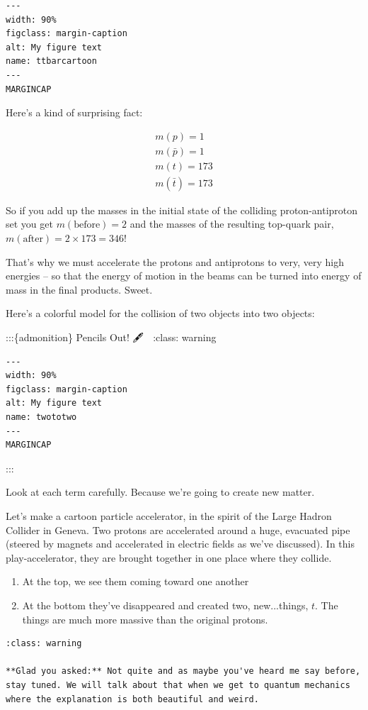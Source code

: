 \documentclass[
]{article}
\begin{document}
\begin{verbatim}
---
width: 90%
figclass: margin-caption
alt: My figure text
name: ttbarcartoon
---
MARGINCAP
\end{verbatim}

Here's a kind of surprising fact:

\begin{align*}
m(p) = 1 \\
m(\bar p) = 1 \\
m(t) = 173 \\
m(\bar t) = 173
\end{align*}

So if you add up the masses in the initial state of the colliding
proton-antiproton set you get \(m(\text{before})=2\) and the masses of
the resulting top-quark pair, \(m(\text{after}) = 2 \times 173 = 346!\)

That's why we must accelerate the protons and antiprotons to very, very
high energies -- so that the energy of motion in the beams can be turned
into energy of mass in the final products. Sweet.

Here's a colorful model for the collision of two objects into two
objects:

:::\{admonition\} Pencils Out! 🖋 📓 :class: warning

\begin{verbatim}
---
width: 90%
figclass: margin-caption
alt: My figure text
name: twototwo
---
MARGINCAP
\end{verbatim}

:::

Look at each term carefully. Because we're going to create new matter.

Let's make a cartoon particle accelerator, in the spirit of the Large
Hadron Collider in Geneva. Two protons are accelerated around a huge,
evacuated pipe (steered by magnets and accelerated in electric fields as
we've discussed). In this play-accelerator, they are brought together in
one place where they collide.

\begin{enumerate}
\def\labelenumi{\arabic{enumi}.}
\item
  At the top, we see them coming toward one another
\item
  At the bottom they've disappeared and created two, new...things,
  \(t\). The things are much more massive than the original protons.
\end{enumerate}

\begin{verbatim}
:class: warning

**Glad you asked:** Not quite and as maybe you've heard me say before, stay tuned. We will talk about that when we get to quantum mechanics where the explanation is both beautiful and weird.
\end{verbatim}
\end{document}
